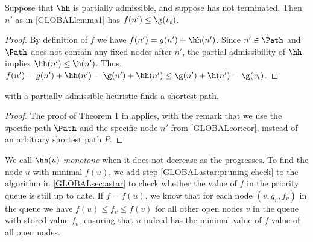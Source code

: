 \begin{cor}\label{GLOBALcor:cor}
  Suppose that $\hh$ is partially admissible, and suppose \A has not terminated.
  Then $n'$ as in \cref{GLOBALlemma1} has $f(n') \leq \g(v_t)$.
\end{cor}
\begin{proof}
  By definition of $f$ we have $f(n') = g(n') + \hh(n')$. Since $n'\in \Path$ and
  $\Path$ does not contain any fixed nodes after $n'$, the partial admissibility of $\hh$
  implies $\hh(n') \leq \h(n')$.
  Thus,
  $f(n') = g(n') + \hh(n') = \g(n') + \hh(n') \leq \g(n') + \h(n') = \g(v_t)$.
\end{proof}
\begin{thm}\label{GLOBALthm:partial-admissible}
  \A with a partially admissible heuristic finds a shortest path.
\end{thm}
\begin{proof}
  The proof of Theorem 1 in \citet{hart1968formal} applies, with the remark that we use the
  specific path $\Path$ and the specific node $n'$ from \cref{GLOBALcor:cor}, instead
  of an arbitrary shortest path $P$.
\end{proof}

\begin{remark}\label{GLOBALremark:monotone}
  We call $\hh(u)$ \emph{monotone} when it does not decrease as the \A
  progresses. To find the node $u$ with minimal $f(u)$, we add
  step \cref{GLOBALastar:pruning-check} to the \A algorithm in \cref{GLOBALsec:astar} to check
  whether the value of $f$ in the priority queue is still up to date.
  If $f=f(u)$, we know that for each node $(v, g_v, f_v)$ in the queue we have
  $f(u)\leq f_v\leq f(v)$ for
  all other open nodes $v$ in the queue with stored value $f_v$, ensuring that
  $u$ indeed has the minimal value of $f$ value of all open nodes.
\end{remark}
